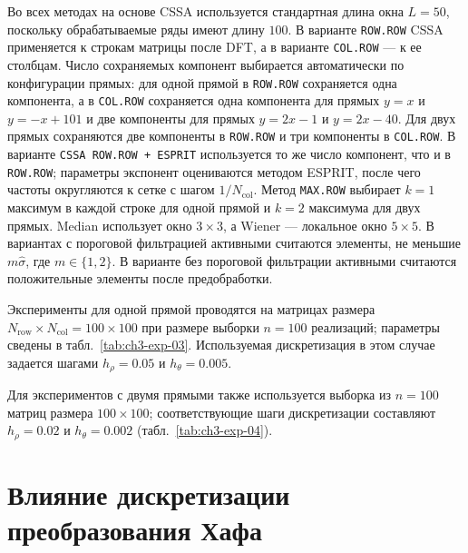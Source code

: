 Во всех методах на основе CSSA используется стандартная длина окна $L=50$, поскольку
обрабатываемые ряды имеют длину $100$. В варианте \texttt{ROW.ROW} CSSA применяется к строкам
матрицы после DFT, а в варианте \texttt{COL.ROW} --- к ее столбцам. Число
сохраняемых компонент выбирается автоматически по конфигурации прямых:
для одной прямой в \texttt{ROW.ROW} сохраняется одна компонента, а в
\texttt{COL.ROW} сохраняется одна компонента для прямых $y=x$ и $y=-x+101$
и две компоненты для прямых $y=2x-1$ и $y=2x-40$. Для двух прямых сохраняются
две компоненты в \texttt{ROW.ROW} и три компоненты в \texttt{COL.ROW}.
В варианте \texttt{CSSA ROW.ROW + ESPRIT} используется то же число компонент,
что и в \texttt{ROW.ROW}; параметры экспонент оцениваются методом ESPRIT,
после чего частоты округляются к сетке с шагом $1/N_{\text{col}}$. Метод
\texttt{MAX.ROW} выбирает $k=1$ максимум в каждой строке для одной прямой и
$k=2$ максимума для двух
прямых. Median использует окно $3\times3$, а Wiener --- локальное окно
$5\times5$. В вариантах с пороговой фильтрацией активными считаются элементы,
не меньшие $m\hat\sigma$, где $m\in\{1,2\}$. В варианте без пороговой
фильтрации активными считаются положительные элементы после предобработки.

Эксперименты для одной прямой проводятся на матрицах размера
$N_{\text{row}}\times N_{\text{col}}=100\times100$ при размере выборки
$n=100$ реализаций; параметры сведены в табл.~\ref{tab:ch3-exp-03}.
Используемая дискретизация в этом случае задается шагами
$h_\rho=0.05$ и $h_\theta=0.005$.

\begin{table}[H]
	\centering
	\caption{Параметры эксперимента для одной прямой}
	\label{tab:ch3-exp-03}
	\resizebox{0.85\textwidth}{!}{%
		
	}
\end{table}

Для экспериментов с двумя прямыми также используется
выборка из $n=100$ матриц размера $100\times100$; соответствующие шаги
дискретизации составляют $h_\rho=0.02$ и $h_\theta=0.002$
(табл.~\ref{tab:ch3-exp-04}).

\begin{table}[H]
	\centering
	\caption{Параметры эксперимента для двух прямых}
	\label{tab:ch3-exp-04}
	\resizebox{0.85\textwidth}{!}{%
		
	}
\end{table}

\section{Влияние дискретизации преобразования Хафа}

